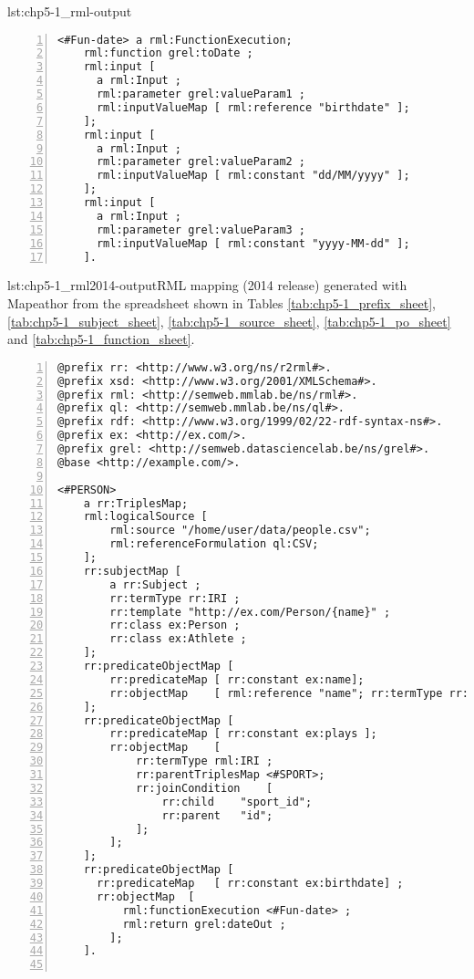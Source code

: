 \begin{captionedlisting}{lst:chp5-1_rml-output}
{\begin{lstlisting}[numbers=left,basicstyle=\ttfamily\small,columns=flexible]
<#Fun-date> a rml:FunctionExecution;
    rml:function grel:toDate ;
    rml:input [
      a rml:Input ;
      rml:parameter grel:valueParam1 ;
      rml:inputValueMap [ rml:reference "birthdate" ];
    ];
    rml:input [
      a rml:Input ;
      rml:parameter grel:valueParam2 ;
      rml:inputValueMap [ rml:constant "dd/MM/yyyy" ];
    ];
    rml:input [
      a rml:Input ;
      rml:parameter grel:valueParam3 ;
      rml:inputValueMap [ rml:constant "yyyy-MM-dd" ];
    ].
\end{lstlisting}}
\end{captionedlisting}

\begin{captionedlisting}{lst:chp5-1_rml2014-output}{RML mapping (2014 release) generated with Mapeathor from the spreadsheet shown in Tables \ref{tab:chp5-1_prefix_sheet}, \ref{tab:chp5-1_subject_sheet}, \ref{tab:chp5-1_source_sheet}, \ref{tab:chp5-1_po_sheet} and \ref{tab:chp5-1_function_sheet}. }
\centering
{\begin{lstlisting}[numbers=left,basicstyle=\ttfamily\small,columns=flexible]
@prefix rr: <http://www.w3.org/ns/r2rml#>.
@prefix xsd: <http://www.w3.org/2001/XMLSchema#>.
@prefix rml: <http://semweb.mmlab.be/ns/rml#>.
@prefix ql: <http://semweb.mmlab.be/ns/ql#>.
@prefix rdf: <http://www.w3.org/1999/02/22-rdf-syntax-ns#>.
@prefix ex: <http://ex.com/>.
@prefix grel: <http://semweb.datasciencelab.be/ns/grel#>.
@base <http://example.com/>.

<#PERSON>
    a rr:TriplesMap;
    rml:logicalSource [
    	rml:source "/home/user/data/people.csv";
    	rml:referenceFormulation ql:CSV;
    ];
    rr:subjectMap [
    	a rr:Subject ;
    	rr:termType rr:IRI ;
    	rr:template "http://ex.com/Person/{name}" ;
    	rr:class ex:Person ;
    	rr:class ex:Athlete ;
    ];
    rr:predicateObjectMap [
    	rr:predicateMap	[ rr:constant ex:name];
    	rr:objectMap	[ rml:reference "name"; rr:termType rr:Literal; rr:datatype xsd:string; rr:language "en" ]
    ];
    rr:predicateObjectMap [
    	rr:predicateMap	[ rr:constant ex:plays ];
    	rr:objectMap	[
    		rr:termType rml:IRI ;
    		rr:parentTriplesMap	<#SPORT>;
    		rr:joinCondition	[
    			rr:child	"sport_id";
    			rr:parent	"id";
    		];
    	];
    ];
    rr:predicateObjectMap [
      rr:predicateMap	[ rr:constant ex:birthdate] ;
      rr:objectMap	[
    	  rml:functionExecution <#Fun-date> ;
    	  rml:return grel:dateOut ;
    	];
    ].


\end{lstlisting}}
\end{captionedlisting}

